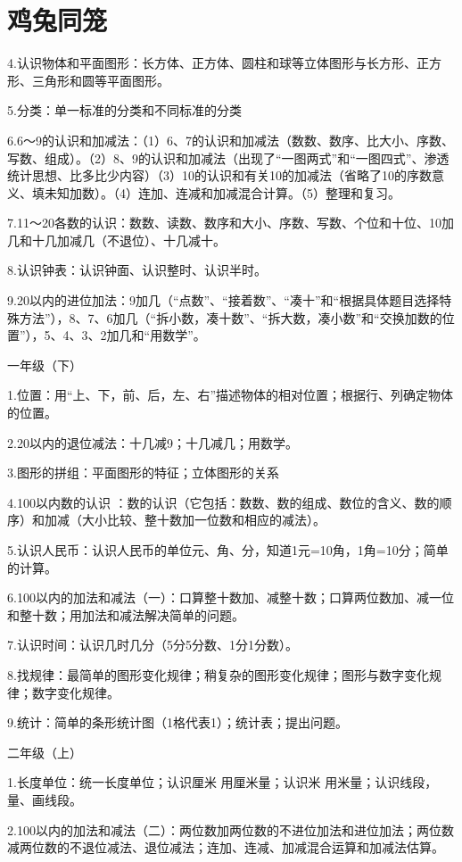 \section{鸡兔同笼}

4.认识物体和平面图形：长方体、正方体、圆柱和球等立体图形与长方形、正方形、三角形和圆等平面图形。

5.分类：单一标准的分类和不同标准的分类

6.6～9的认识和加减法：（1）6、7的认识和加减法（数数、数序、比大小、序数、写数、组成）。（2）8、9的认识和加减法（出现了“一图两式”和“一图四式”、渗透统计思想、比多比少内容）（3）10的认识和有关10的加减法（省略了10的序数意义、填未知加数）。（4）连加、连减和加减混合计算。（5）整理和复习。

7.11～20各数的认识：数数、读数、数序和大小、序数、写数、个位和十位、10加几和十几加减几（不退位）、十几减十。

8.认识钟表：认识钟面、认识整时、认识半时。

9.20以内的进位加法：9加几（“点数”、“接着数”、“凑十”和“根据具体题目选择特殊方法”），8、7、6加几（“拆小数，凑十数”、“拆大数，凑小数”和“交换加数的位置”），5、4、3、2加几和“用数学”。

一年级（下）

1.位置：用“上、下，前、后，左、右”描述物体的相对位置；根据行、列确定物体的位置。

2.20以内的退位减法：十几减9；十几减几；用数学。

3.图形的拼组：平面图形的特征；立体图形的关系

4.100以内数的认识 ：数的认识（它包括：数数、数的组成、数位的含义、数的顺序）和加减（大小比较、整十数加一位数和相应的减法）。

5.认识人民币：认识人民币的单位元、角、分，知道1元=10角，1角=10分；简单的计算。

6.100以内的加法和减法（一）：口算整十数加、减整十数；口算两位数加、减一位和整十数；用加法和减法解决简单的问题。

7.认识时间：认识几时几分（5分5分数、1分1分数）。

8.找规律：最简单的图形变化规律；稍复杂的图形变化规律；图形与数字变化规律；数字变化规律。

9.统计：简单的条形统计图（1格代表1）；统计表；提出问题。

二年级（上）

1.长度单位：统一长度单位；认识厘米 用厘米量；认识米 用米量；认识线段，量、画线段。

2.100以内的加法和减法（二）：两位数加两位数的不进位加法和进位加法；两位数减两位数的不退位减法、退位减法；连加、连减、加减混合运算和加减法估算。

